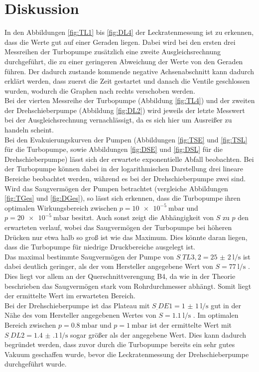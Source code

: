 
\section{Diskussion}
\label{sec:Diskussion}

In den Abbildungen \ref{fig:TL1} bis \ref{fig:DL4} der Leckratenmessung ist zu erkennen, dass die Werte gut auf einer Geraden liegen. Dabei wird bei den ersten drei Messreihen der Turbopumpe zusätzlich eine zweite Ausgleichsrechnung durchgeführt, die zu einer geringeren Abweichung der Werte von den Geraden führen. Der dadurch zustande kommende negative Achsenabschnitt kann dadurch erklärt werden, dass zuerst die Zeit gestartet und danach die Ventile geschlossen wurden, wodurch die Graphen nach rechts verschoben werden.\\
Bei der vierten Messreihe der Turbopumpe (Abbildung \ref{fig:TL4}) und der zweiten der Drehschieberpumpe (Abbildung \ref{fig:DL2}) wird jeweils der letzte Messwert bei der Ausgleichsrechnung vernachlässigt, da es sich hier um Ausreißer zu handeln scheint.\\
Bei den Evakuierungskurven der Pumpen (Abbildungen \ref{fig:TSE} und \ref{fig:TSL} für die Turbopumpe, sowie Abbildungen \ref{fig:DSE} und \ref{fig:DSL} für die Drehschieberpumpe) lässt sich der erwartete exponentielle Abfall beobachten. Bei der Turbopumpe können dabei in der logarithmischen Darstellung drei lineare Bereiche beobachtet werden, während es bei der Drehschieberpumpe zwei sind.\\
Wird das Saugvermögen der Pumpen betrachtet (vergleiche Abbildungen \ref{fig:TGes} und \ref{fig:DGes}), so lässt sich erkennen, dass die Turbopumpe ihren optimalen Wirkungsbereich zwischen $p=\SI{10e-5}{\milli\bar}$ und $p=\SI{20e-5}{\milli\bar}$ besitzt. Auch sonst zeigt die Abhängigkeit von $S$ zu $p$ den erwarteten verlauf, wobei das Saugvermögen der Turbopumpe bei höheren Drücken nur etwa halb so groß ist wie das Maximum. Dies könnte daran liegen, dass die Turbopumpe für niedrige Druckbereiche ausgelegt ist.\\
Das maximal bestimmte Saugvermögen der Pumpe von $S_.{TL3,2}=\SI{25(2)}{\litre\per\second}$ ist dabei deutlich geringer, als der vom Hersteller angegebene Wert von $S=\SI{77}{\litre\per\second}$ \cite{V70}. Dies liegt vor allem an der Querschnittverengung B4, da wie in der Theorie beschrieben das Saugvermögen stark vom Rohrdurchmesser abhängt. Somit liegt der ermittelte Wert im erwarteten Bereich.\\
Bei der Drehschieberpumpe ist das Plateau mit $S_.{DE1}=\SI{1(1)}{\litre\per\second}$ gut in der Nähe des vom Hersteller angegebenen Wertes von $S=\SI{1.1}{\litre\per\second}$ \cite{V70}.
Im optimalen Bereich zwischen $p=\SI{0.8}{\milli\bar}$ und $p=\SI{1}{\milli\bar}$ ist der ermittelte Wert mit $S_.{DL2}=\SI{1.4(1)}{\litre\per\second}$ sogar größer als der angegebene Wert. Dies kann dadurch begründet werden, dass zuvor durch die Turbopumpe bereits ein sehr gutes Vakuum geschaffen wurde, bevor die Leckratenmessung der Drehschieberpumpe durchgeführt wurde.   